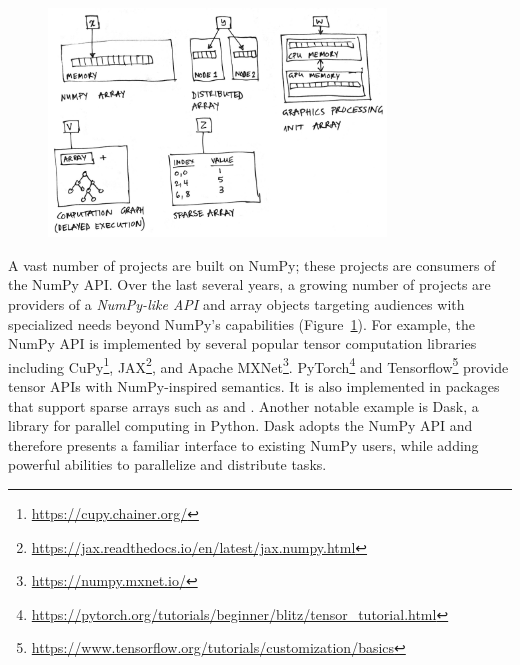 \begin{figure}
  \centering
  \includegraphics[width=0.8\textwidth]{static/sketches/duck-arrays}
  \caption{}
  \label{fig:duck-arrays}
\end{figure}



A vast number of projects are built on NumPy;
these projects are consumers of the NumPy API.
Over the last several years, a growing number of projects are providers of
a \emph{NumPy-like API} and array objects targeting audiences with specialized
needs beyond NumPy's capabilities (Figure~\ref{fig:duck-arrays}).
For example, the NumPy API is implemented by several popular tensor computation
libraries including CuPy\footnote{\url{https://cupy.chainer.org/}},
JAX\footnote{\url{https://jax.readthedocs.io/en/latest/jax.numpy.html}},
and Apache MXNet\footnote{\url{https://numpy.mxnet.io/}}.
PyTorch\footnote{\url{https://pytorch.org/tutorials/beginner/blitz/tensor\_tutorial.html}}
and Tensorflow\footnote{\url{https://www.tensorflow.org/tutorials/customization/basics}}
provide tensor APIs with NumPy-inspired semantics.
It is also implemented in packages that support sparse arrays
such as  and .
Another notable example is Dask, a library for parallel computing in
Python.  Dask adopts the NumPy API and therefore presents a familiar
interface to existing NumPy users, while adding powerful abilities to
parallelize and distribute tasks.

